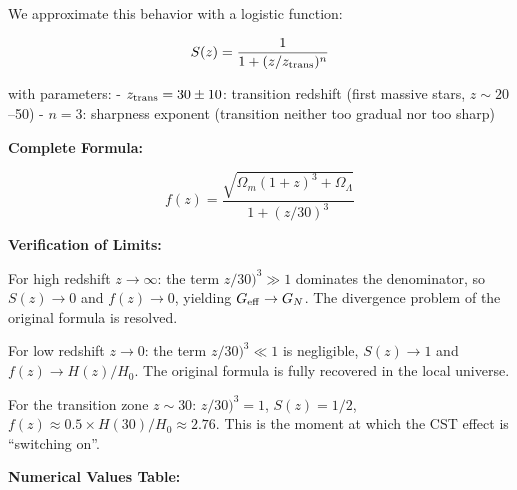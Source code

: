 \documentclass[11pt,a4paper]{article}
\begin{document}
We approximate this behavior with a logistic function:

\[S(z) = \frac{1}{1 + (z/z_{\rm trans})^n}\]

with parameters: - \(z_{\rm trans} = 30 \pm 10\): transition redshift
(first massive stars, \(z \sim 20\)--50) - \(n = 3\): sharpness exponent
(transition neither too gradual nor too sharp)

\textbf{Complete Formula:}

\[\boxed{f(z) = \frac{\sqrt{\Omega_m(1+z)^3 + \Omega_\Lambda}}{1 + (z/30)^3}}\]

\textbf{Verification of Limits:}

For high redshift \(z \to \infty\): the term \(z/30)^3 \gg 1\)
dominates the denominator, so \(S(z) \to 0\) and \(f(z) \to 0\),
yielding \(G_{\rm eff} \to G_N\). The divergence problem of the original
formula is resolved.

For low redshift \(z \to 0\): the term \(z/30)^3 \ll 1\) is negligible,
\(S(z) \to 1\) and \(f(z) \to H(z)/H_0\). The original formula is fully
recovered in the local universe.

For the transition zone \(z \sim 30\): \(z/30)^3 = 1\), \(S(z) = 1/2\),
\(f(z) \approx 0.5 \times H(30)/H_0 \approx 2.76\). This is the moment
at which the CST effect is ``switching on''.

\textbf{Numerical Values Table:}
\end{document}
